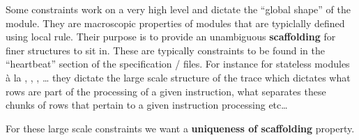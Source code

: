 Some constraints work on a very high level and dictate the ``global shape'' of the module.
They are macroscopic properties of modules that are typiclally defined using local rule.
Their purpose is to provide an unambiguous \textbf{scaffolding} for finer structures to sit in.
These are typically constraints to be found in the ``heartbeat'' section of the specification / \corset{} files.
For instance for stateless modules à la \wcpMod, \addMod, \shfMod, \dots{} they dictate the large scale structure of the trace which dictates what rows are part of the processing of a given instruction, what separates these chunks of rows that pertain to a given instruction processing etc\dots{} 

For these large scale constraints we want a \textbf{uniqueness of scaffolding} property.
